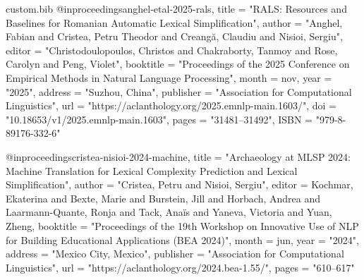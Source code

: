 \begin{filecontents*}[overwrite]{custom.bib}
%
@inproceedings{anghel-etal-2025-rals,
    title = "{RALS}: Resources and Baselines for {R}omanian Automatic Lexical Simplification",
    author = "Anghel, Fabian  and
      Cristea, Petru Theodor  and
      Creang{\u a}, Claudiu  and
      Nisioi, Sergiu",
    editor = "Christodoulopoulos, Christos  and
      Chakraborty, Tanmoy  and
      Rose, Carolyn  and
      Peng, Violet",
    booktitle = "Proceedings of the 2025 Conference on Empirical Methods in Natural Language Processing",
    month = nov,
    year = "2025",
    address = "Suzhou, China",
    publisher = "Association for Computational Linguistics",
    url = "https://aclanthology.org/2025.emnlp-main.1603/",
    doi = "10.18653/v1/2025.emnlp-main.1603",
    pages = "31481--31492",
    ISBN = "979-8-89176-332-6"
}

@inproceedings{cristea-nisioi-2024-machine,
    title = "Archaeology at {MLSP} 2024: Machine Translation for Lexical Complexity Prediction and Lexical Simplification",
    author = "Cristea, Petru  and
      Nisioi, Sergiu",
    editor = {Kochmar, Ekaterina  and
      Bexte, Marie  and
      Burstein, Jill  and
      Horbach, Andrea  and
      Laarmann-Quante, Ronja  and
      Tack, Ana{\"i}s  and
      Yaneva, Victoria  and
      Yuan, Zheng},
    booktitle = "Proceedings of the 19th Workshop on Innovative Use of NLP for Building Educational Applications (BEA 2024)",
    month = jun,
    year = "2024",
    address = "Mexico City, Mexico",
    publisher = "Association for Computational Linguistics",
    url = "https://aclanthology.org/2024.bea-1.55/",
    pages = "610--617"
}


\end{filecontents*}
